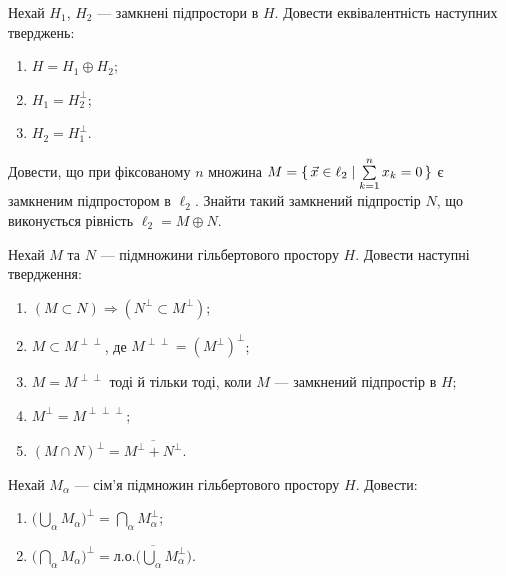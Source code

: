
\begin{exercise}
    Нехай $H_1$, $H_2$ --- замкнені підпростори в $H$.
    Довести еквівалентність наступних тверджень:
    \begin{enumerate}[label=\ukr*)]
        \item $H = H_1 \oplus H_2$;
        \item $H_1 = H_2^\perp $;
        \item $H_2 = H_1^\perp $.
    \end{enumerate}
\end{exercise}

\begin{exercise}
    Довести, що при фіксованому $n$ множина $M = \set{ \vec{x} \in \ell_2
    \mid \sum\limits^n_{k=1} x_k=0 }$ є замкненим підпростором в $\ell_2$.
    Знайти такий замкнений підпростір $N$, що виконується рівність $\ell_2 = M \oplus N$.
\end{exercise}

\begin{exercise}
    Нехай $M$ та $N$ --- підмножини гільбертового простору $H$. Довести наступні твердження:
    \begin{enumerate}[label=\ukr*)]
        \item $(M \subset N) \Rightarrow (N^\perp \subset M^\perp)$;
        \item $M \subset M^{\perp\perp}$, де $M^{\perp\perp}={(M^\perp)}^\perp$;
        \item $M = M^{\perp\perp}$ тоді й тільки тоді, коли $M$ ---
              замкнений підпростір в $H$;
        \item $M^\perp = M^{\perp\perp\perp}$;
        \item $(M \cap N)^\perp = \overline{M^\perp + N^\perp}$.
    \end{enumerate}
\end{exercise}

\begin{exercise}
    Нехай $M_\alpha$ --- сім'я підмножин гільбертового простору $H$. Довести:
    \begin{enumerate}[label=\ukr*)]
        \item $\Big( \bigcup\limits_\alpha M_\alpha \Big)^\perp = 
              \bigcap\limits_\alpha M_\alpha^\perp$;
        \item $\Big( \bigcap\limits_\alpha M_\alpha \Big)^\perp = 
              \overline{\text{л.о.}\Big(\bigcup\limits_\alpha M_\alpha^\perp\Big)}$.
    \end{enumerate}
\end{exercise}

